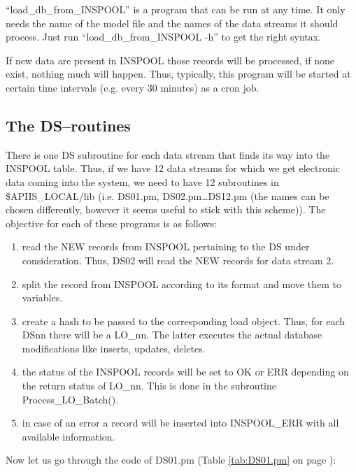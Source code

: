 {}``load\_db\_from\_INSPOOL'' is
a program that can be run at any time. It only needs the name of the
model file and the names of the data streams it
should process. Just run {}``load\_db\_from\_INSPOOL -h'' to get
the right syntax. 

If new data are present in INSPOOL those records
will be processed, if none exist, nothing much will happen. Thus,
typically, this program will be started at certain time intervals
(e.g. every 30 minutes) as a cron job.


\subsection{The DS--routines}

There is one DS subroutine for each data stream that finds its way
into the INSPOOL table. Thus, if we have 12 data streams for which
we get electronic data coming into the system, we need to have 12
subroutines in \$APIIS\_LOCAL/lib (i.e. DS01.pm, DS02.pm\ldots{}DS12.pm
(the names can be chosen differently, however it seems useful to stick
with this scheme)). The objective for each of these programs is as
follows:

\begin{enumerate}
\item read the NEW records from INSPOOL pertaining to the DS under consideration.
Thus, DS02 will read the NEW records for data stream 2.
\item split the record from INSPOOL according to its format and move them
to variables.
\item create a hash to be passed to the corresponding load object. Thus,
for each DSnn there will be a LO\_nn. The latter executes the actual
database modifications like inserts, updates, deletes.
\item the status of the INSPOOL records will be set to OK or ERR depending
on the return status of LO\_nn. This is done in the subroutine Process\_LO\_Batch().
\item in case of an error a record will be inserted into INSPOOL\_ERR with
all available information.
\end{enumerate}
Now let us go through the code of DS01.pm (Table \ref{tab:DS01.pm}
on page \pageref{tab:DS01.pm}):

